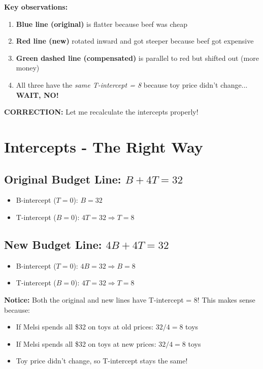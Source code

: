 \documentclass[12pt]{article}
\begin{document}
\textbf{Key observations:}
\begin{enumerate}
    \item \textbf{Blue line (original)} is flatter because beef was cheap
    \item \textbf{Red line (new)} rotated inward and got steeper because beef got expensive
    \item \textbf{Green dashed line (compensated)} is parallel to red but shifted out (more money)
    \item All three have the \textit{same T-intercept = 8} because toy price didn't change... \textbf{WAIT, NO!}
\end{enumerate}

\textbf{CORRECTION:} Let me recalculate the intercepts properly!

\newpage

\section*{Intercepts - The Right Way}

\subsection*{Original Budget Line: $B + 4T = 32$}
\begin{itemize}
    \item B-intercept ($T=0$): $B = 32$
    \item T-intercept ($B=0$): $4T = 32 \Rightarrow T = 8$
\end{itemize}

\subsection*{New Budget Line: $4B + 4T = 32$}
\begin{itemize}
    \item B-intercept ($T=0$): $4B = 32 \Rightarrow B = 8$
    \item T-intercept ($B=0$): $4T = 32 \Rightarrow T = 8$
\end{itemize}

\textbf{Notice:} Both the original and new lines have T-intercept = 8! This makes sense because:
\begin{itemize}
    \item If Melsi spends all \$32 on toys at old prices: $32/4 = 8$ toys
    \item If Melsi spends all \$32 on toys at new prices: $32/4 = 8$ toys
    \item Toy price didn't change, so T-intercept stays the same!
\end{itemize}
\end{document}
